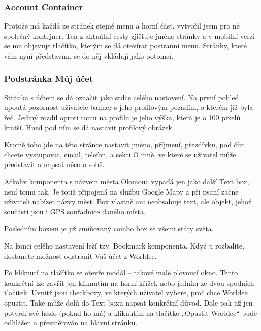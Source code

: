\subsubsection{Account Container}
Protože má každá ze stránek stejné menu a horní část, vytvořil jsem pro ně společný kontejner. Ten z aktuální cesty zjišťuje jméno stránky 
a v mobilní verzi se mu objevuje tlačítko, kterým se dá otevírat postranní menu. Stránky, které vám nyní představím, se do něj vkládají jako potomci.

\subsubsection{Podstránka Můj účet}
Stránka s účtem se dá označit jako srdce celého nastavení. Na první pohled upoutá pozornost uživatele banner s jeho profilovým pozadím, o kterém již byla řeč. Jediný rozdíl oproti tomu na profilu je jeho výška, která je o 100 pixelů kratší. Hned pod ním se dá nastavit profilový obrázek.

Kromě toho jde na této stránce nastavit jméno, příjmení, přezdívku, pod čím chcete vystupovat, email, telefon, a sekci O mně, ve které se uživatel může představit a napsat něco o sobě.

Ačkoliv komponenta s názvem města Olomouc vypadá jen jako další Text box, není tomu tak. Je totiž připojená na službu Google Mapy a při psaní začne uživateli nabízet názvy měst. Box vlastně ani neobsahuje text, ale objekt, jehož součástí jsou i GPS souřadnice daného místa.

Posledním boxem je již zmiňovaný combo box se všemi státy světa.

Na konci celého nastavení leží tzv. Bookmark komponenta. Když ji rozbalíte, dostanete možnost odstranit Váš účet z Worldee.

Po kliknutí na tlačítko se otevře modál – takové malé plovoucí okno. Tento konkrétní lze zavřít jen kliknutím na horní křížek nebo jedním ze dvou spodních tlačítek. Uvnitř jsou checkboxy, ve kterých uživatel vybere, proč chce Worldee opustit. Také může dolů do Text boxu napsat konkrétní důvod. Dole pak už jen potvrdí své heslo (pokud ho má) a kliknutím na tlačítko „Opustit Worldee“ bude odhlášen a přesměrován na hlavní stránku.

